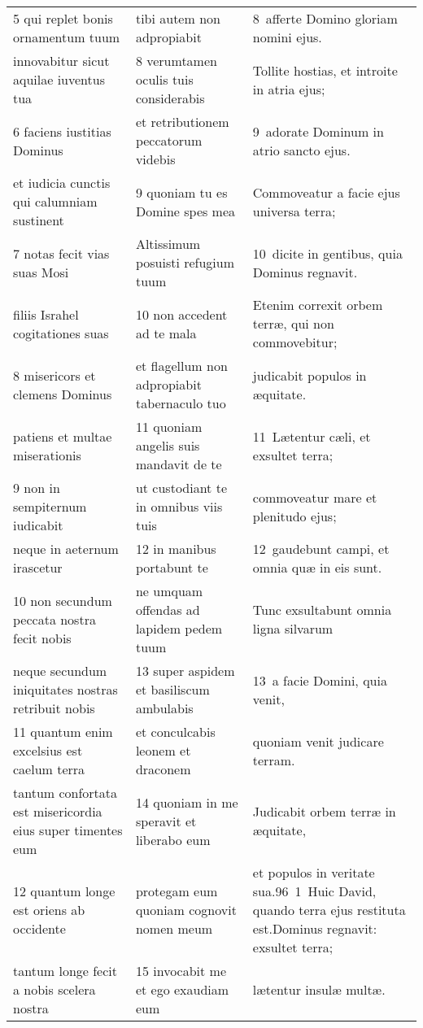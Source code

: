 \documentclass{article}
\begin{document}
\begin{longtable}{@{}p{}p{}p{}@{}}
5 qui replet bonis ornamentum tuum	&	tibi autem non adpropiabit	&	8 afferte Domino gloriam nomini ejus.	\\
innovabitur sicut aquilae iuventus tua	&	8 verumtamen oculis tuis considerabis	&	Tollite hostias, et introite in atria ejus;	\\
6 faciens iustitias Dominus	&	et retributionem peccatorum videbis	&	9 adorate Dominum in atrio sancto ejus.	\\
et iudicia cunctis qui calumniam sustinent	&	9 quoniam tu es Domine spes mea	&	Commoveatur a facie ejus universa terra;	\\
7 notas fecit vias suas Mosi	&	Altissimum posuisti refugium tuum	&	10 dicite in gentibus, quia Dominus regnavit.	\\
filiis Israhel cogitationes suas	&	10 non accedent ad te mala	&	Etenim correxit orbem terræ, qui non commovebitur;	\\
8 misericors et clemens Dominus	&	et flagellum non adpropiabit tabernaculo tuo	&	judicabit populos in æquitate.	\\
patiens et multae miserationis	&	11 quoniam angelis suis mandavit de te	&	11 Lætentur cæli, et exsultet terra;	\\
9 non in sempiternum iudicabit	&	ut custodiant te in omnibus viis tuis	&	commoveatur mare et plenitudo ejus;	\\
neque in aeternum irascetur	&	12 in manibus portabunt te	&	12 gaudebunt campi, et omnia quæ in eis sunt.	\\
10 non secundum peccata nostra fecit nobis	&	ne umquam offendas ad lapidem pedem tuum	&	Tunc exsultabunt omnia ligna silvarum	\\
neque secundum iniquitates nostras retribuit nobis	&	13 super aspidem et basiliscum ambulabis	&	13 a facie Domini, quia venit,	\\
11 quantum enim excelsius est caelum terra	&	et conculcabis leonem et draconem	&	quoniam venit judicare terram.	\\
tantum confortata est misericordia eius super timentes eum	&	14 quoniam in me speravit et liberabo eum	&	Judicabit orbem terræ in æquitate,	\\
12 quantum longe est oriens ab occidente	&	protegam eum quoniam cognovit nomen meum	&	et populos in veritate sua.96 1 Huic David, quando terra ejus restituta est.Dominus regnavit: exsultet terra;	\\
tantum longe fecit a nobis scelera nostra	&	15 invocabit me et ego exaudiam eum	&	lætentur insulæ multæ.	\\

\end{longtable}
\end{document}
